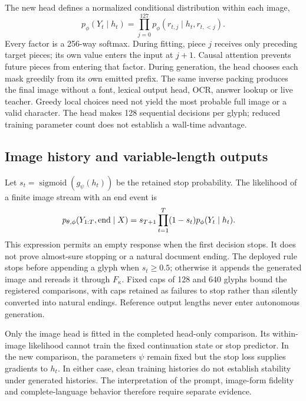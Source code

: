 The new head defines a normalized conditional distribution within each image,
\begin{equation}
 p_\phi(Y_t\mid h_t)=\prod_{j=0}^{127}
 p_\phi(r_{t,j}\mid h_t,r_{t,<j}).
 \label{eq:joint-glyph-density}
\end{equation}
Every factor is a 256-way softmax. During fitting, piece $j$ receives only
preceding target pieces; its own value enters the input at $j+1$. Causal
attention prevents future pieces from entering that factor. During generation,
the head chooses each mask greedily from its own emitted prefix. The same
inverse packing produces the final image without a font, lexical output head,
OCR, answer lookup or live teacher. Greedy local choices need not yield the
most probable full image or a valid character. The head makes 128 sequential
decisions per glyph; reduced training parameter count does not establish a
wall-time advantage.

\subsection*{Image history and variable-length outputs}
Let $s_t=\operatorname{sigmoid}(g_\psi(h_t))$ be the retained stop
probability. The likelihood of a finite image stream with an end event is
\begin{equation}
 \begin{aligned}
 p_{\theta,\phi}(Y_{1:T},{\rm end}\mid X)
  &=s_{T+1}\prod_{t=1}^{T}
       (1-s_t)p_\phi(Y_t\mid h_t).
 \end{aligned}
 \label{eq:joint-glyph-stream}
\end{equation}
This expression permits an empty response when the first decision stops. It
does not prove almost-sure stopping or a natural document ending. The deployed
rule stops before appending a glyph when $s_t\geq0.5$; otherwise it appends the
generated image and rereads it through $F_\kappa$. Fixed caps of 128 and 640
glyphs bound the registered comparisons, with caps retained as failures to
stop rather than silently converted into natural endings. Reference output
lengths never enter autonomous generation.

Only the image head is fitted in the completed head-only comparison. Its
within-image likelihood cannot train the fixed continuation state or stop
predictor. In the new comparison, the parameters $\psi$ remain fixed but the
stop loss supplies gradients to $h_t$. In either case, clean
training histories do not establish stability under generated histories.
The interpretation of the prompt, image-form fidelity and complete-language
behavior therefore require separate evidence.

